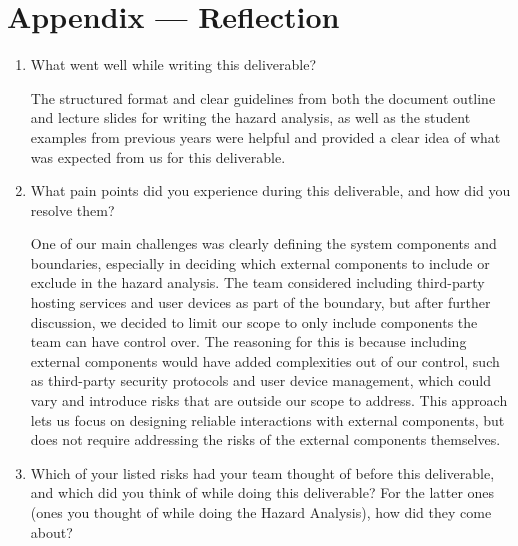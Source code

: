 \documentclass{article}
\begin{document}
\section*{Appendix --- Reflection}



\begin{enumerate}
    \item What went well while writing this deliverable? 
    
    \hspace{1.5em} The structured format and clear guidelines from both the document outline and lecture slides for writing the hazard 
    analysis, as well as the student examples from previous years were helpful and provided a clear idea of what was 
    expected from us for this deliverable.\\

    \item What pain points did you experience during this deliverable, and how
    did you resolve them?

    \hspace{1.5em} One of our main challenges was clearly defining the system components and boundaries, especially in deciding which 
    external components to include or exclude in the hazard analysis. The team considered including third-party hosting services 
    and user devices as part of the boundary, but after further discussion, we decided to limit our scope to only include 
    components the team can have control over. The reasoning for this is because including external components would have 
    added complexities out of our control, such as third-party security protocols and user device management, which could 
    vary and introduce risks that are outside our scope to address. This approach lets us focus on designing reliable 
    interactions with external components, but does not require addressing the risks of the external components themselves.\\

    \item Which of your listed risks had your team thought of before this
    deliverable, and which did you think of while doing this deliverable? For
    the latter ones (ones you thought of while doing the Hazard Analysis), how
    did they come about?


\end{enumerate}
\end{document}
